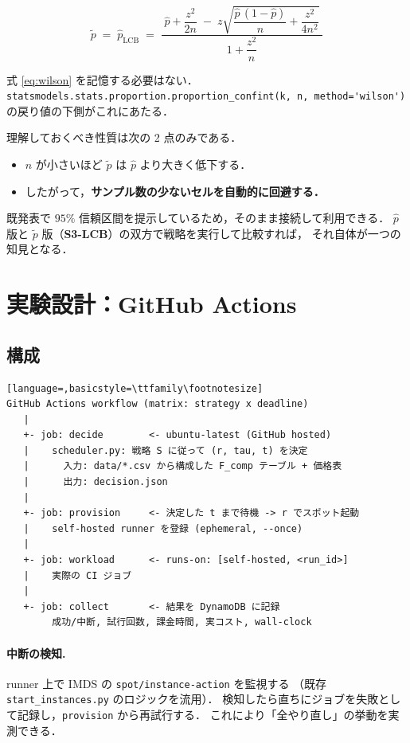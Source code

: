 \documentclass[11pt,a4paper]{ltjsarticle}
\begin{document}
\begin{equation}
\tilde{p}
\;=\;
\hat{p}_{\mathrm{LCB}}
\;=\;
\frac{\;\hat p + \dfrac{z^{2}}{2n}
      \;-\; z\sqrt{\dfrac{\hat p\,(1-\hat p)}{n} + \dfrac{z^{2}}{4n^{2}}}\;}
     {1 + \dfrac{z^{2}}{n}}
\label{eq:wilson}
\end{equation}

式 \eqref{eq:wilson} を記憶する必要はない．
\verb|statsmodels.stats.proportion.proportion_confint(k, n, method='wilson')|
の戻り値の下側がこれにあたる．

理解しておくべき性質は次の 2 点のみである．

\begin{itemize}
  \item $n$ が小さいほど $\tilde p$ は $\hat p$ より大きく低下する．
  \item したがって，\textbf{サンプル数の少ないセルを自動的に回避する．}
\end{itemize}

既発表で $95\%$ 信頼区間を提示しているため，そのまま接続して利用できる．
$\hat p$ 版と $\tilde p$ 版（\textbf{S3-LCB}）の双方で戦略を実行して比較すれば，
それ自体が一つの知見となる．

\section{実験設計：GitHub Actions}

\subsection{構成}

\begin{lstlisting}[language=,basicstyle=\ttfamily\footnotesize]
GitHub Actions workflow (matrix: strategy x deadline)
   |
   +- job: decide        <- ubuntu-latest (GitHub hosted)
   |    scheduler.py: 戦略 S に従って (r, tau, t) を決定
   |      入力: data/*.csv から構成した F_comp テーブル + 価格表
   |      出力: decision.json
   |
   +- job: provision     <- 決定した t まで待機 -> r でスポット起動
   |    self-hosted runner を登録 (ephemeral, --once)
   |
   +- job: workload      <- runs-on: [self-hosted, <run_id>]
   |    実際の CI ジョブ
   |
   +- job: collect       <- 結果を DynamoDB に記録
        成功/中断, 試行回数, 課金時間, 実コスト, wall-clock
\end{lstlisting}

\paragraph{中断の検知.}
runner 上で IMDS の \verb|spot/instance-action| を監視する
（既存 \texttt{start\_instances.py} のロジックを流用）．
検知したら直ちにジョブを失敗として記録し，\texttt{provision} から再試行する．
これにより「全やり直し」の挙動を実測できる．
\end{document}
